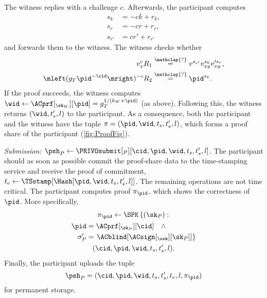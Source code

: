 The witness replies with a challenge \(c\).
Afterwards, the participant computes
\begin{align*}
s_k &= -ck + r_k, \\
s_r &= -cr + r_r, \\
s_{r'} &= cr' + r_{r'}
\end{align*}
and forwards them to the witness.
The witness checks whether
\begin{align*}
  v_x^c R_1 &\overset{\mathclap{?}}{=} v^{s_{r'}} v_{xy}^{s_k} v_{xy}^{\prime 
    s_r}, \\
  \mleft(g_T \pid^{-\cid}\mright)^{-c} R_2 &\overset{\mathclap{?}}{=} 
  \pid^{s_k}.
\end{align*}
If the proof succeeds, the witness computes \(\wid\gets \ACprf[_{\sk_W}][\pid] = g_T^{1/(k_W+\pid)}\) (as above).
Following this, the witness returns \((\wid, t_s', l)\) to the participant.
As a consequence, both the participant and the witness have the tuple \(\pi = (\pid, \wid, t_s, t_s', l)\), which forms a proof share of the participant (\cref{fig:ProofFig}).


\emph{Submission: \(\psh_P\gets \PRIVOsubmit[_P][\cid, \pid, \wid, t_s, t_s',  l]\).}
The participant should as soon as possible commit the proof-share data to the time-stamping service and receive the proof of commitment, \(t_e\gets 
  \TSstamp[\Hash[\pid, \wid, t_s, t_s', l]]\).
The remaining operations are not time critical.
The participant computes  proof \(\pi_{\pid}\), which shows the correctness of \(\pid\).
More specifically,
\begin{multline*}
  \pi_{\pid}\gets \SPK\left\{ (\sk_P) : \right. \\
    \begin{aligned}
      \pid &= \ACprf[_{\sk_P}][\cid] \quad \land \\
      \sigma_P' &= \left. \ACblind[\ACsign[_{\ssk}][\sk_P]] \right\}
    \end{aligned} \\
      (\cid, \pid, \wid, t_s, t_s', l).
\end{multline*}
Finally, the participant uploads the tuple \[  \psh_P = (\cid, \pid, \wid, t_s, t_s', t_e, l, \pi_{\pid})\] for permanent storage.

